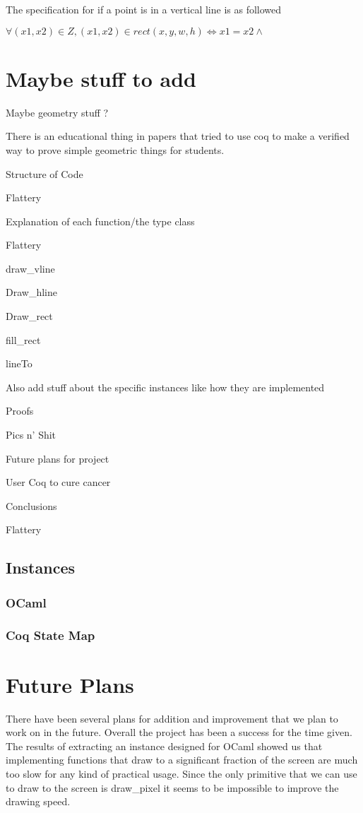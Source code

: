 \documentclass{llncs}
\begin{document}
The specification for if a point is in a vertical line is as followed

$\forall (x1,x2) \in Z, (x1,x2) \in rect (x,y,w,h) \iff x1 = x2 \land $
\section{Maybe stuff to add}
Maybe geometry stuff ? 

There is an educational thing in papers that tried to use coq to make a verified way to prove simple geometric things for students.

Structure of Code

Flattery

Explanation of each function/the type class

Flattery

draw\_vline

Draw\_hline

Draw\_rect

fill\_rect

lineTo

Also add stuff about the specific instances like how they are implemented

Proofs

Pics n’ Shit 

Future plans for project

User Coq to cure cancer 

Conclusions

Flattery


\subsection{Instances}
  \subsubsection{OCaml}
  \subsubsection{Coq State Map}


\section{Future Plans}
There have been several plans for addition and improvement that we plan to work on in the future.  Overall the project has been a success for the
time given.  The results of extracting an instance designed for OCaml showed us that implementing functions that draw to a significant fraction of the screen are much too slow for any kind of practical usage.  Since the only primitive that we can use to draw to the screen is draw\_pixel it seems to be impossible to improve the drawing speed.
\end{document}
